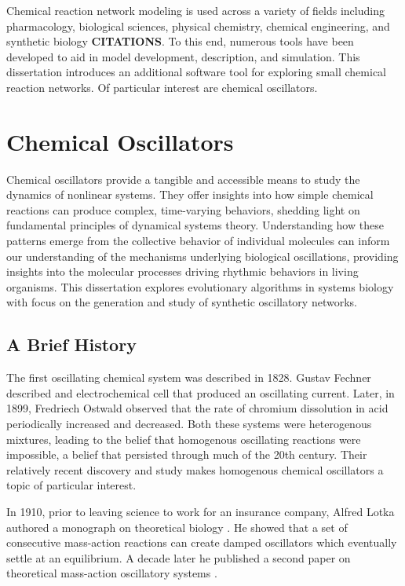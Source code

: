 \documentclass[12pt]{report}
\begin{document}
Chemical reaction network modeling is used across a variety of fields including pharmacology, biological sciences, physical chemistry, chemical engineering, and synthetic biology \textbf{CITATIONS}. To this end, numerous tools have been developed to aid in model development, description, and simulation. This dissertation introduces an additional software tool for exploring small chemical reaction networks. Of particular interest are chemical oscillators.


\section{Chemical Oscillators}
\label{section:intro_oscillators}

Chemical oscillators provide a tangible and accessible means to study the dynamics of nonlinear systems. They offer insights into how simple chemical reactions can produce complex, time-varying behaviors, shedding light on fundamental principles of dynamical systems theory. Understanding how these patterns emerge from the collective behavior of individual molecules can inform our understanding of the mechanisms underlying biological oscillations, providing insights into the molecular processes driving rhythmic behaviors in living organisms. This dissertation explores evolutionary algorithms in systems biology with focus on the generation and study of synthetic oscillatory networks.

\subsection{A Brief History}
The first oscillating chemical system was described in 1828. Gustav Fechner described and electrochemical cell that produced an oscillating current. Later, in 1899, Fredriech Ostwald observed that the rate of chromium dissolution in acid periodically increased and decreased. Both these systems were heterogenous mixtures, leading to the belief that homogenous oscillating reactions were impossible, a belief that persisted through much of the 20th century. Their relatively recent discovery and study makes homogenous chemical oscillators a topic of particular interest. 

In 1910, prior to leaving science to work for an insurance company, Alfred Lotka authored a monograph on theoretical biology \cite{Lotka1910}. He showed that a set of consecutive mass-action reactions can create damped oscillators which eventually settle at an equilibrium. A decade later he published a second paper on theoretical mass-action oscillatory systems \cite{Lotka1920, Lotka1920b}.
\end{document}
